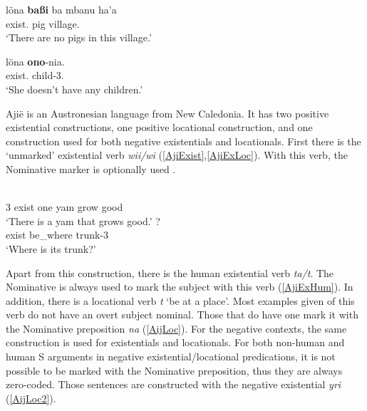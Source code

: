 \begin{exe} \ex\label{NiaNegExist}
\begin{xlist} \ex \gll l\"ona \textbf{ba{\ss}i} ba mbanu ha'a\\
exist.\Neg{} pig \loc{} village.\mut{} \prox{}\\
\glt `There are no pigs in this village.'

\ex \gll l\"ona \textbf{ono}-nia.\\
exist.\Neg{} child-3\sg{}.\poss{}\\
\glt `She doesn't have any children.'
\end{xlist} 
\end{exe}


Aji\"e is an Austronesian language from New Caledonia. 
It has two positive existential constructions, one positive locational construction, and one construction used for both negative existentials and locationals.
First there is the `unmarked' existential verb \emph{wii/wi} (\ref{AjiExist},\ref{AjiExLoc}).  
With this verb, the Nominative marker is optionally used \citep[109]{Lichtenberk:1978}.

\pagebreak
\begin{exe}\ex{}
\begin{xlist}
\ex\label{AjiExist}\gll{}  \textbf{} \textbf{}   \\
3\sg{} exist one yam \relativ{} grow good\\
\glt `There is a yam that grows good.' 
\ex\label{AjiExLoc}\gll{}  \textbf{} \textbf{}?\\
exist be\_where \nom{} trunk-3\sg{}\\
\glt `Where is its trunk?' 
\end{xlist} 
\end{exe}

Apart from this construction, there is the human existential verb \emph{ta/t\textturnv}. 
The Nominative is always used to mark the subject with this verb (\ref{AjiExHum}). 
In addition, there is a locational verb \emph{t\textopeno} `be at a place'.
Most examples given of this verb do not have an overt subject nominal. 
Those that do have one mark it with the Nominative preposition \emph{na} (\ref{AijLoc}). 
For the negative contexts, the same construction is used for existentials and locationals.
For both non-human and human S arguments in negative existential/locational predications, it is not possible to be marked with the Nominative preposition, thus they are always zero-coded.
Those sentences are constructed with the negative existential \emph{y\textepsilon ri} (\ref{AijLoc2}). 

